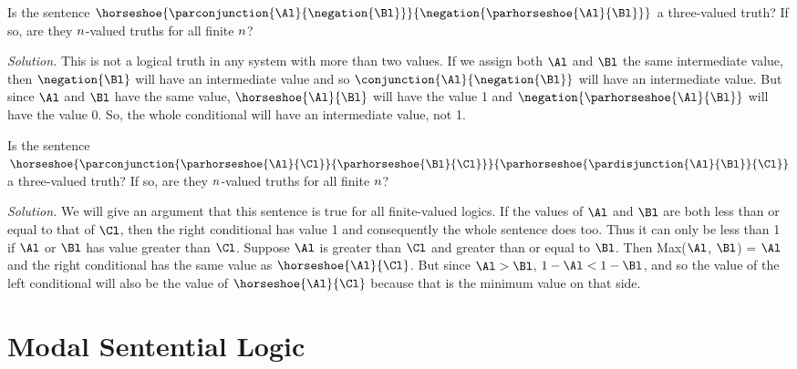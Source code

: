 
\begin{majorILnc}{}
Is the sentence  $\horseshoe{\parconjunction{\Al}{\negation{\Bl}}}{\negation{\parhorseshoe{\Al}{\Bl}}}$ a three-valued truth? 
If so, are they $n$-valued truths for all finite $n$? 

\noindent{}\emph{Solution.} This is not a logical truth in any system with more than two values. 
If we assign both $\Al$ and $\Bl$ the same intermediate value, then $\negation{\Bl}$ will have an intermediate value and so $\conjunction{\Al}{\negation{\Bl}}$ will have an intermediate value. 
But since $\Al$ and $\Bl$ have the same value, $\horseshoe{\Al}{\Bl}$ will have the value 1 and $\negation{\parhorseshoe{\Al}{\Bl}}$ will have the value 0. 
So, the whole conditional will have an intermediate value, not 1.
\end{majorILnc}
\begin{majorILnc}{}
Is the sentence  $\horseshoe{\parconjunction{\parhorseshoe{\Al}{\Cl}}{\parhorseshoe{\Bl}{\Cl}}}{\parhorseshoe{\pardisjunction{\Al}{\Bl}}{\Cl}}$ a three-valued truth? 
If so, are they $n$-valued truths for all finite $n$? 

\noindent{}\emph{Solution.} We will give an argument that this sentence is true for all finite-valued logics. 
If the values of $\Al$ and $\Bl$ are both less than or equal to that of $\Cl$, then the right conditional has value 1 and consequently the whole sentence does too. 
Thus it can only be less than 1 if $\Al$ or $\Bl$ has value greater than $\Cl$. 
Suppose $\Al$ is greater than $\Cl$ and greater than or equal to $\Bl$. 
Then Max($\Al$, $\Bl$) = $\Al$ and the right conditional has the same value as $\horseshoe{\Al}{\Cl}$.  
But since $\Al > \Bl$, $1-\Al < 1-\Bl$, and so the value of the left conditional will also be the value of $\horseshoe{\Al}{\Cl}$ because that is the minimum value on that side.
\end{majorILnc}

\section{Modal Sentential Logic}\label{modal sentential logic}

